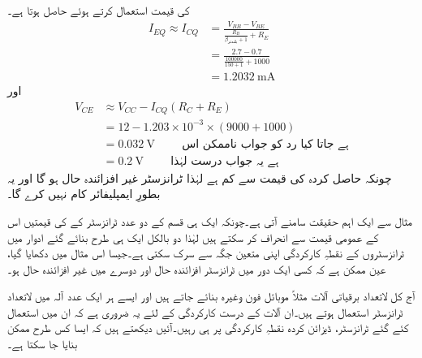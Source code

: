 \begin{enumerate}
	 کی قیمت استعمال کرتے ہوئے حاصل ہوتا ہے۔
\begin{align*}
I_{EQ} \approx I_{CQ} &=\frac{V_{BB}-V_{BE}}{\frac{R_B}{\beta_{\textrm{بلندتر}}+1}+R_E}\\
&=\frac{2.7-0.7}{\frac{100000}{150+1}+1000}\\
&=\SI{1.2032}{\milli \ampere}
\end{align*}
اور
\begin{align*}
V_{CE} & \approx V_{CC}-I_{CQ} \left (R_C+R_E \right )\\ 
&=12-1.203 \times 10^{-3} \times \left (9000+1000 \right )\\
&=\SI{0.032}{\volt} \hspace{1cm} \textrm{ہے جاتا کیا رد کو جواب ناممکن اس}\\
&=\SI{0.2}{\volt} \hspace{1cm} \textrm{ہے یہ جواب درست لہٰذا}
\end{align*}
	چونکہ حاصل کردہ   کی قیمت  سے کم ہے لہٰذا ٹرانزسٹر غیر افزائندہ حال ہو گا اور یہ بطورِ ایمپلیفائر کام نہیں کرے گا۔ 
\end{enumerate}
	
مثال   سے ایک اہم حقیقت سامنے آتی ہے۔چونکہ ایک ہی قسم کے دو عدد ٹرانزسٹر کے  کی قیمتیں اس کے عمومی قیمت  سے انحراف کر سکتے ہیں لہٰذا دو بالکل ایک ہی طرح بنائے گئے ادوار میں ٹرانزسٹروں کے نقطہِ کارکردگی اپنی متعین جگہ سے سرک سکتی ہے۔جیسا اس مثال میں دکھایا گیا، عین ممکن ہے کہ کسی ایک دور میں ٹرانزسٹر افزائندہ حال اور دوسرے میں غیر افزائندہ حال ہو۔

آج کل لاتعداد برقیاتی آلات مثلاً موبائل فون وغیرہ بنائے جاتے ہیں اور ایسے ہر ایک عدد آلہ میں لاتعداد ٹرانزسٹر استعمال ہوتے ہیں۔ان آلات کے درست کارکردگی کے لئے یہ ضروری ہے کہ ان میں استعمال کئے گئے ٹرانزسٹر، ڈیزائن کردہ نقطہِ کارکردگی پر ہی رہیں۔آئیں دیکھتے ہیں کہ ایسا کس طرح ممکن بنایا جا سکتا ہے۔

